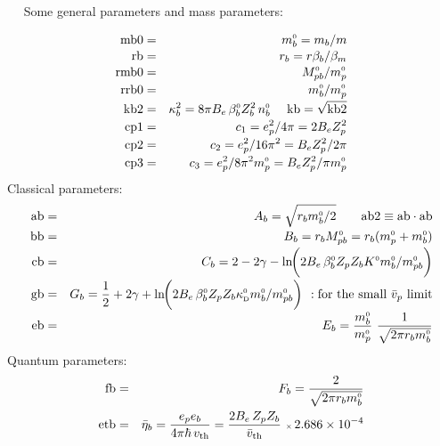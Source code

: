 \documentclass[preprint,12pt,eqsecnum,nofootinbib,amsmath,amssymb]{revtex4}
\newcommand{\smD}{{\rm\scriptscriptstyle D}}
\newcommand{\smO}{{\rm\scriptscriptstyle 0}}
\begin{document}
~~
\vskip-1cm 
Some general parameters and mass parameters:
\begin{mathletters}
\begin{eqnarray}
  {\rm mb0} &=& m_b^\smO = m_b/m
\\[-2pt]
  {\rm rb} &=& r_b = 
  r \beta_b/\beta_m 
\\[-2pt]
  {\rm rmb0} &=& M_{pb}^\smO/m_p^\smO
\\[-2pt]
  {\rm rrb0} &=& m_b^\smO/m_p^\smO
\\[-2pt]
  {\rm kb2} &=& \kappa_b^2 = 8 \pi B_e \,
  \beta_b^\smO Z_b^2\,n_b^\smO ~~~~
  {\rm kb} = \sqrt{{\rm kb2}}
\\[-2pt]
  {\rm cp1} &=& c_1 = e_p^2/4\pi =
  2 B_e Z_p^2 
\\[-2pt]
  {\rm cp2} &=& c_2  = e_p^2/16\pi^2 =
  B_e Z_p^2/2\pi
\\[-2pt]
  {\rm cp3} &=& c_3  = e_p^2/8\pi^2 m_p^\smO =
  B_e Z_p^2/\pi m_p^\smO 
\end{eqnarray}
\vskip-0.5cm 
Classical parameters:
\begin{eqnarray}
  {\rm ab} &=& A_b = 
  \sqrt{r_b m_b^\smO/2}
  ~~~~~~{\rm ab2} \equiv {\rm ab}
  \cdot {\rm ab}
\\[-2pt]
  {\rm bb} &=& B_b =
  r_b M_{pb}^\smO = r_b (m_p^\smO + m_b^\smO)
\\[-2pt]
  {\rm cb} &=& C_b = 
  2 - 2\gamma - \ln\hskip-0.1cm \bigg(
  2 B_e\, \beta_b^\smO Z_p Z_b K^\smO 
  m_b^\smO/m_{pb}^\smO\bigg)
\\[-2pt]
  {\rm gb} &=&   G_b =
  \frac{1}{2} + 2\gamma + \ln\hskip-0.1cm \bigg(
  2 B_e\, \beta_b^\smO Z_p Z_b \kappa_\smD^\smO 
  m_b^\smO/m_{pb}^\smO\bigg) 
  ~~{\rm : for~the~small~} \bar v_p {\rm ~limit}
\\[-2pt]
  {\rm eb} &=& E_b = 
  \frac{m_b^\smO}{m_p^\smO} ~
  \frac{1}{\sqrt{2\pi r_b m_b^\smO}}
\end{eqnarray}
\vskip-0.2cm 
Quantum parameters:
\begin{eqnarray}
  {\rm fb} &=& F_b = 
  \frac{2}{\sqrt{2\pi r_b m_b^\smO}}
\\
  {\rm etb} &=& \bar\eta_b = 
  \frac{e_p e_b}{4\pi\hbar\, v_{\rm th}}
  = \frac{2 B_e\, Z_p Z_b}{\bar v_{\rm th}}~
  {\scriptscriptstyle \times}\,
  2.686 \times 10^{-4} 
\end{eqnarray}
\end{mathletters}
\end{document}

